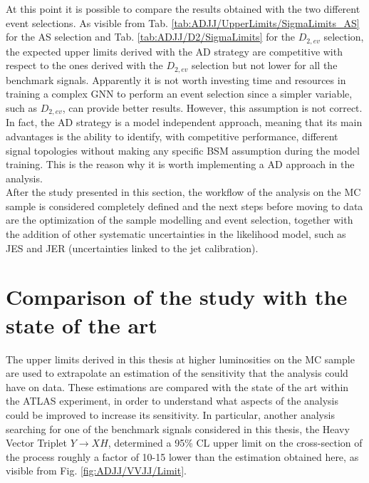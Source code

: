 \noindent At this point it is possible to compare the results obtained with the two different event selections.
As visible from Tab. \ref{tab:ADJJ/UpperLimits/SigmaLimits_AS} for the AS selection and Tab. \ref{tab:ADJJ/D2/SigmaLimits} for the $D_{2,ev}$ selection, the expected upper limits derived with the AD strategy are competitive with respect to the ones derived with the $D_{2,ev}$ selection but not lower for all the benchmark signals.
Apparently it is not worth investing time and resources in training a complex GNN to perform an event selection since a simpler variable, such as $D_{2,ev}$, can provide better results.
However, this assumption is not correct.
In fact, the AD strategy is a model independent approach, meaning that its main advantages is the ability to identify, with competitive performance, different signal topologies without making any specific BSM assumption during the model training.
This is the reason why it is worth implementing a AD approach in the analysis.\\
After the study presented in this section, the workflow of the analysis on the MC sample is considered completely defined and the next steps before moving to data are the optimization of the sample modelling and event selection, together with the addition of other systematic uncertainties in the likelihood model, such as JES and JER (uncertainties linked to the jet calibration).


\section{Comparison of the study with the state of the art}\label{sec:ADJJ/VVJJ}

The upper limits derived in this thesis at higher luminosities on the MC sample are used to extrapolate an estimation of the sensitivity that the analysis could have on data.
These estimations are compared with the state of the art within the ATLAS experiment, in order to understand what aspects of the analysis could be improved to increase its sensitivity.
In particular, another analysis \cite{ATLAS_AD_VVJJ} searching for one of the benchmark signals considered in this thesis, the Heavy Vector Triplet $Y\to XH$, determined a 95\% CL upper limit on the cross-section of the process roughly a factor of 10-15 lower than the estimation obtained here, as visible from Fig. \ref{fig:ADJJ/VVJJ/Limit}.

